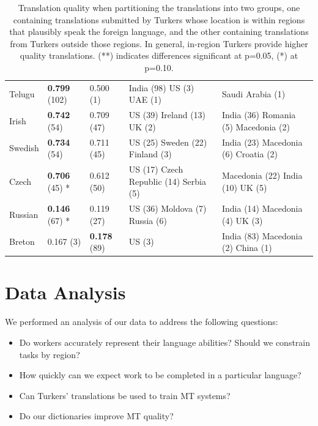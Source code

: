 \documentclass[11pt]{article}
\begin{document}
\begin{table}
\begin{center}
\begin{tabular}{lllll}
Telugu & \textbf{0.799} (102) & 0.500 (1) & India (98) US (3) UAE (1)  & Saudi Arabia (1)  \\
Irish & \textbf{0.742} (54) & 0.709 (47) & US (39) Ireland (13) UK (2)  & India (36) Romania (5) Macedonia (2)  \\
Swedish & \textbf{0.734} (54) & 0.711 (45) & US (25) Sweden (22) Finland (3)  & India (23) Macedonia (6) Croatia (2)  \\
Czech & \textbf{0.706} (45) * & 0.612 (50) & US (17) Czech Republic (14) Serbia (5)  & Macedonia (22) India (10) UK (5)  \\
Russian & \textbf{0.146} (67) * & 0.119 (27) & US (36) Moldova (7) Russia (6)  & India (14) Macedonia (4) UK (3)  \\
Breton & 0.167 (3) & \textbf{0.178} (89) & US (3)  & India (83) Macedonia (2) China (1) \\
\hline\hline
\end{tabular}
\normalsize
\end{center}
\caption{Translation quality when partitioning the translations into two groups, one containing translations submitted by Turkers whose location is within regions that plausibly speak the foreign language, and the other containing translations from Turkers outside those regions. In general, in-region Turkers provide higher quality translations. (**) indicates differences significant at p=0.05, (*) at p=0.10.} \label{region-summary}
\end{table}

\section{Data Analysis} \label{sec:data-analysis}

We performed an analysis of our data to address the following questions:
\begin{itemize}
\item Do workers accurately represent their language abilities?  Should we constrain tasks by region? 
\item How quickly can we expect work to be completed in a particular language? 
\item Can Turkers' translations be used to train MT systems? 
\item Do our dictionaries improve MT quality?
\end{itemize}
\end{document}
